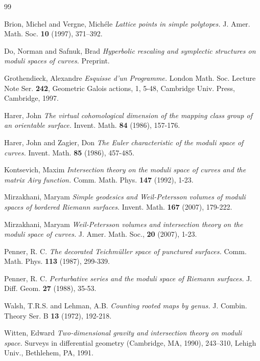 \documentclass{amsart}
\begin{document}
\begin{thebibliography}{99}

 Brion, Michel and Vergne, Mich\'ele 
\emph{Lattice points in simple polytopes.} 
J. Amer. Math. Soc. {\bf 10} (1997), 371--392.

 Do, Norman and Safnuk, Brad
\emph{Hyperbolic rescaling and symplectic structures on moduli spaces of curves.}  Preprint.

 Grothendieck, Alexandre
\emph{Esquisse d'un Programme.}
London Math. Soc. Lecture Note Ser. {\bf 242}, Geometric Galois actions, 1, 5-48, Cambridge Univ. Press, Cambridge, 1997.

 Harer, John 
\emph{The virtual cohomological dimension of the mapping class group of an orientable surface.} 
Invent. Math. {\bf 84} (1986), 157-176.

 Harer, John and Zagier, Don
\emph{The Euler characteristic of the moduli space of curves.}
Invent. Math. {\bf 85} (1986), 457-485.

  Kontsevich, Maxim 
\emph{Intersection theory on the moduli space of curves and the matrix Airy function.} 
Comm. Math. Phys. {\bf 147} (1992), 1-23.

Mirzakhani, Maryam 
\emph{Simple geodesics and Weil-Petersson volumes of moduli spaces of bordered Riemann surfaces.}
Invent. Math. {\bf 167} (2007), 179-222.

Mirzakhani, Maryam 
\emph{Weil-Petersson volumes and intersection theory on the moduli space of curves.}
J. Amer. Math. Soc., {\bf 20} (2007), 1-23.

  Penner, R. C. 
\emph{The decorated Teichm\"uller space of punctured surfaces.} Comm. Math. Phys. {\bf 113} (1987), 299-339.

  Penner, R. C. 
\emph{Perturbative series and the moduli space of Riemann surfaces.} J. Diff. Geom. {\bf 27} (1988), 35-53.

  Walsh, T.R.S.  and Lehman, A.B.  
\emph{Counting rooted maps by genus.} 
J. Combin. Theory Ser. B {\bf 13} (1972), 192-218.

 Witten, Edward
\emph{Two-dimensional gravity and intersection theory on moduli space.} Surveys in differential geometry (Cambridge, MA, 1990), 243--310, Lehigh Univ., Bethlehem, PA, 1991.

\end{thebibliography}
 
\end{document}
